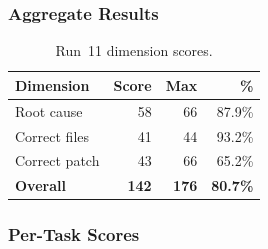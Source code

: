 \subsubsection{Aggregate Results}

\begin{table}[h]
\centering
\caption{Run~11 dimension scores.}\label{tab:r11-dim}
\begin{tabular}{lrrr}
\toprule
\textbf{Dimension} & \textbf{Score} & \textbf{Max} & \textbf{\%} \\
\midrule
Root cause         & 58 & 66 & 87.9\% \\
Correct files      & 41 & 44 & 93.2\% \\
Correct patch      & 43 & 66 & 65.2\% \\
\midrule
\textbf{Overall}   & \textbf{142} & \textbf{176} & \textbf{80.7\%} \\
\bottomrule
\end{tabular}
\end{table}

\subsubsection{Per-Task Scores}

